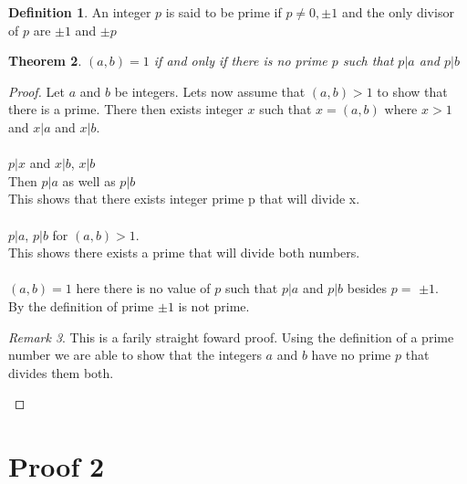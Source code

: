 \documentclass{article}
\newtheorem{thm}{Theorem}[section]
\theoremstyle{definition}
\newtheorem{definition}[thm]{Definition}
\theoremstyle{remark}
\newtheorem{remark}[thm]{Remark}
\numberwithin{equation}{section}
\begin{document}
\begin{definition}\label{def}
An integer $p$ is said to be prime if $p \neq 0, \pm 1$ and the only divisor of $p$ are $\pm 1$ and $\pm p$\\
\end{definition}
\begin{thm}
$(a,b) = 1$ if and only if there is no prime $p$ such that $p|a$ and $p|b$\\
\end{thm}
\begin{proof}
Let $a$ and $b$ be integers. Lets now assume that $(a,b) > 1$ to show that there is a prime. There then exists integer $x$ such that $x = (a,b)$ where $x > 1$ and $x|a$ and $x|b$. \\\\
$p|x$ and $x|b$, $x|b$\\
Then $p|a$ as well as $p|b$\\
This shows that there exists integer prime p that will divide x. \\\\
 $p|a$, $p|b$ for $(a,b) > 1$.\\
This shows there exists a prime that will divide both numbers.\\ \\
$(a,b) = 1$ here there is no value of $p$ such that $p|a$ and $p|b$ besides $p =$ $\pm 1$.\\
By the definition of prime $\pm 1$ is not prime.
\\
\begin{remark}
This is a farily straight foward proof. Using the definition of a prime number we are able to show that the integers $a$ and $b$ have no prime $p$ that divides them both.
\end{remark}

\end{proof}




\section{Proof 2}
\end{document}
